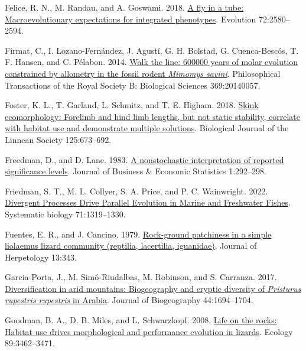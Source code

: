 \documentclass[
  11pt,
]{article}
\newlength{\cslhangindent}
\newlength{\cslentryspacingunit} %
\newenvironment{CSLReferences}[2] %
 {%
  \setlength{\parindent}{0pt}
  \ifodd #1
  \let\oldpar\par
  \def\par{\hangindent=\cslhangindent\oldpar}
  \fi
  \setlength{\parskip}{#2\cslentryspacingunit}
 }%
 {}
\begin{document}
\begin{CSLReferences}{1}{0}
\leavevmode{}%
Felice, R. N., M. Randau, and A. Goswami. 2018.
\href{https://doi.org/10.1111/evo.13608}{A fly in a tube:
Macroevolutionary expectations for integrated phenotypes}. Evolution
72:2580--2594.

\leavevmode{}%
Firmat, C., I. Lozano-Fernández, J. Agustí, G. H. Bolstad, G.
Cuenca-Bescós, T. F. Hansen, and C. Pélabon. 2014.
\href{https://doi.org/10.1098/rstb.2014.0057}{Walk the line: 600000
years of molar evolution constrained by allometry in the fossil rodent
\emph{{M}imomys savini}}. Philosophical Transactions of the Royal
Society B: Biological Sciences 369:20140057.

\leavevmode{}%
Foster, K. L., T. Garland, L. Schmitz, and T. E. Higham. 2018.
\href{https://doi.org/10.1093/biolinnean/bly146}{{Skink ecomorphology:
Forelimb and hind limb lengths, but not static stability, correlate with
habitat use and demonstrate multiple solutions}}. Biological Journal of
the Linnean Society 125:673--692.

\leavevmode{}%
Freedman, D., and D. Lane. 1983.
\href{https://doi.org/10.2307/1391660}{A nonstochastic interpretation of
reported significance levels}. Journal of Business {\&} Economic
Statistics 1:292--298.

\leavevmode{}%
Friedman, S. T., M. L. Collyer, S. A. Price, and P. C. Wainwright. 2022.
\href{https://doi.org/10.1093/sysbio/syab080}{{Divergent Processes Drive
Parallel Evolution in Marine and Freshwater Fishes}}. Systematic biology
71:1319--1330.

\leavevmode{}%
Fuentes, E. R., and J. Cancino. 1979.
\href{https://doi.org/10.2307/1563330}{Rock-ground patchiness in a
simple liolaemus lizard community (reptilia, lacertilia, iguanidae)}.
Journal of Herpetology 13:343.

\leavevmode{}%
Garcia-Porta, J., M. Simó-Riudalbas, M. Robinson, and S. Carranza. 2017.
\href{https://doi.org/10.1111/jbi.12929}{Diversification in arid
mountains: Biogeography and cryptic diversity of \emph{{P}risturus
rupestris rupestris} in {A}rabia}. Journal of Biogeography
44:1694--1704.

\leavevmode{}%
Goodman, B. A., D. B. Miles, and L. Schwarzkopf. 2008.
\href{https://doi.org/10.1890/07-2093.1}{{Life on the rocks: Habitat use
drives morphological and performance evolution in lizards}}. Ecology
89:3462--3471.


\end{CSLReferences}
\end{document}
